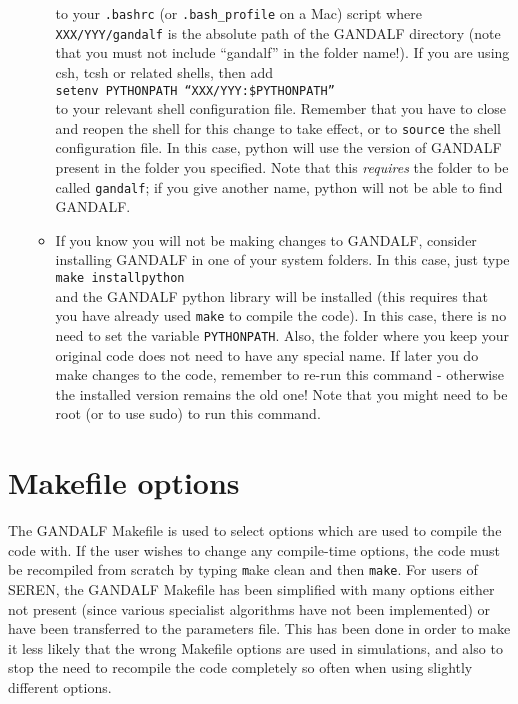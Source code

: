 \documentclass[a4paper]{article}
\newcommand{\var}[1]{\texttt{#1}}
\begin{document}
\begin{itemize}
\begin{itemize}
\noindent to your \var{.bashrc} (or \var{.bash\_profile} on a Mac) script where \var{XXX/YYY/gandalf} is the absolute path of the GANDALF directory (note that you must not include ``gandalf'' in the folder name!). If you are using csh, tcsh or related shells, then add \\
\newline
\noindent \var{setenv PYTHONPATH ``XXX/YYY:\$PYTHONPATH''} \\

\noindent to your relevant shell configuration file. Remember that you have to close and reopen the shell for this change to take effect, or to \var{source} the shell configuration file. In this case, python will use the version of GANDALF present in the folder you specified. Note that this \textit{requires} the folder to be called \var{gandalf}; if you give another name, python will not be able to find GANDALF.

\item If you know you will not be making changes to GANDALF, consider installing GANDALF in one of your system folders. In this case, just type \\
\newline
\var{make installpython}
\\

\noindent and the GANDALF python library will be installed (this requires that you have already used \var{make} to compile the code). In this case, there is no need to set the variable \var{PYTHONPATH}. Also, the folder where you keep your original code does not need to have any special name. If later you do make changes to the code, remember to re-run this command - otherwise the installed version remains the old one! Note that you might need to be root (or to use sudo) to run this command.

\end{itemize}

\end{itemize}



\newpage

\section{Makefile options} \label{S:MAKEFILE}
The GANDALF Makefile is used to select options which are used to compile the code with.  If the user wishes to change any compile-time options, the code must be recompiled from scratch by typing {\var make clean} and then \var{make}.  For users of SEREN, the GANDALF Makefile has been simplified with many options either not present (since various specialist algorithms have not been implemented) or have been transferred to the parameters file.  This has been done in order to make it less likely that the wrong Makefile options are used in simulations, and also to stop the need to recompile the code completely so often when using slightly different options.
\end{document}
